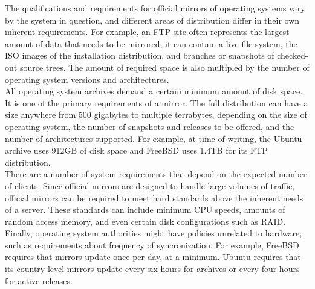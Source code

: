 \documentclass[conference]{IEEEtran}
\begin{document}
The qualifications and requirements for official mirrors of operating systems
vary by the system in question, and different areas of distribution
differ in their own inherent requirements.
For example, an FTP site often represents the largest amount of data
that needs to be mirrored; it can contain a live file system,
the ISO images of the installation distribution, and branches
or snapshots of checked-out source trees.
The amount of required space is also multipled
by the number of operating system versions and architectures.\\
\indent All operating system archives demand a certain minimum
amount of disk space. It is one of the primary requirements of a mirror.
The full distribution can have a size anywhere from 500 gigabytes to
multiple terrabytes, depending on the size of operating system,
the number of snapshots and releases to be offered, and the number of
architectures supported. For example, at time of writing,
the Ubuntu archive uses 912GB of disk space and FreeBSD uses 1.4TB for its FTP distribution.\\
\indent There are a number of system requirements that depend on
the expected number of clients. Since official mirrors are designed
to handle large volumes of traffic, official mirrors can be required to
meet hard standards above the inherent needs of a server.
These standards can include minimum CPU speeds, amounts of random access
memory, and even certain disk configurations such as RAID.\\
\indent Finally, operating system authorities might have policies
unrelated to hardware, such as requirements about frequency of syncronization.
For example, FreeBSD requires that mirrors update once per day, at a minimum. Ubuntu requires that its country-level mirrors
update every six hours for archives or every four hours for active releases.
\end{document}
